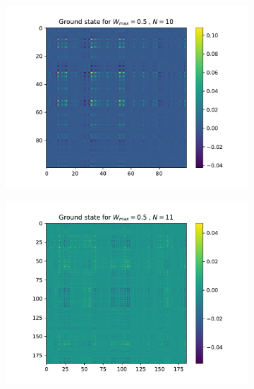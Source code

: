 \documentclass[reprint,amsmath,amssymb,aps,prb]{revtex4-2}
\begin{document}
\newpage
\begin{figure}[h!]
	\begin{subfigure}[c]{0.3\textwidth}
		\includegraphics[width=\textwidth]{../results/N10_trainingset_groundstate_Wmax0.5.pdf}
	\end{subfigure}
	\begin{subfigure}[c]{0.3\textwidth}
		\includegraphics[width=\textwidth]{../results/N11_trainingset_groundstate_Wmax0.5.pdf}
	\end{subfigure}
	\begin{subfigure}[c]{0.3\textwidth}

\end{subfigure}
\end{figure}
\end{document}
